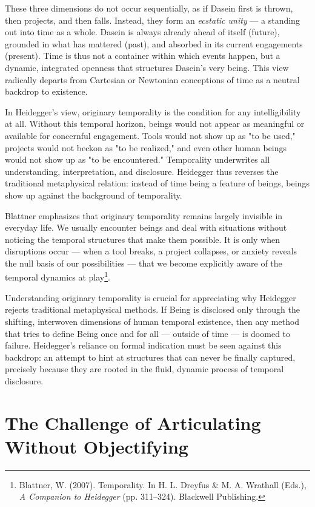 \documentclass{article}
\begin{document}
These three dimensions do not occur sequentially, as if Dasein first is thrown, then projects, and then falls. Instead, they form an \textit{ecstatic unity} --- a standing out into time as a whole. Dasein is always already ahead of itself (future), grounded in what has mattered (past), and absorbed in its current engagements (present). Time is thus not a container within which events happen, but a dynamic, integrated openness that structures Dasein's very being. This view radically departs from Cartesian or Newtonian conceptions of time as a neutral backdrop to existence.

In Heidegger's view, originary temporality is the condition for any intelligibility at all. Without this temporal horizon, beings would not appear as meaningful or available for concernful engagement. Tools would not show up as "to be used," projects would not beckon as "to be realized," and even other human beings would not show up as "to be encountered." Temporality underwrites all understanding, interpretation, and disclosure. Heidegger thus reverses the traditional metaphysical relation: instead of time being a feature of beings, beings show up against the background of temporality.

Blattner emphasizes that originary temporality remains largely invisible in everyday life. We usually encounter beings and deal with situations without noticing the temporal structures that make them possible. It is only when disruptions occur --- when a tool breaks, a project collapses, or anxiety reveals the null basis of our possibilities --- that we become explicitly aware of the temporal dynamics at play\footnote{Blattner, W. (2007). Temporality. In H. L. Dreyfus \& M. A. Wrathall (Eds.), \textit{A Companion to Heidegger} (pp. 311--324). Blackwell Publishing.}.

Understanding originary temporality is crucial for appreciating why Heidegger rejects traditional metaphysical methods. If Being is disclosed only through the shifting, interwoven dimensions of human temporal existence, then any method that tries to define Being once and for all --- outside of time --- is doomed to failure. Heidegger's reliance on formal indication must be seen against this backdrop: an attempt to hint at structures that can never be finally captured, precisely because they are rooted in the fluid, dynamic process of temporal disclosure.

\section*{The Challenge of Articulating  \\ Without Objectifying}
\end{document}
